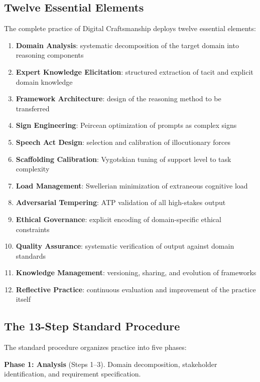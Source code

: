 \documentclass[12pt,a4paper]{article}
\begin{document}
\subsection{Twelve Essential Elements}

The complete practice of Digital Craftsmanship deploys twelve essential elements:

\begin{enumerate}
  \item \textbf{Domain Analysis}: systematic decomposition of the target domain into reasoning components
  \item \textbf{Expert Knowledge Elicitation}: structured extraction of tacit and explicit domain knowledge
  \item \textbf{Framework Architecture}: design of the reasoning method to be transferred
  \item \textbf{Sign Engineering}: Peircean optimization of prompts as complex signs
  \item \textbf{Speech Act Design}: selection and calibration of illocutionary forces
  \item \textbf{Scaffolding Calibration}: Vygotskian tuning of support level to task complexity
  \item \textbf{Load Management}: Swellerian minimization of extraneous cognitive load
  \item \textbf{Adversarial Tempering}: ATP validation of all high-stakes output
  \item \textbf{Ethical Governance}: explicit encoding of domain-specific ethical constraints
  \item \textbf{Quality Assurance}: systematic verification of output against domain standards
  \item \textbf{Knowledge Management}: versioning, sharing, and evolution of frameworks
  \item \textbf{Reflective Practice}: continuous evaluation and improvement of the practice itself
\end{enumerate}

\subsection{The 13-Step Standard Procedure}

The standard procedure organizes practice into five phases:

\textbf{Phase 1: Analysis} (Steps 1--3). Domain decomposition, stakeholder identification, and requirement specification.
\end{document}
